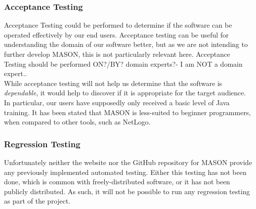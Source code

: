 \documentclass[11pt]{article}
\begin{document}



\subsubsection{Acceptance Testing}
Acceptance Testing could be performed to determine if the software can be operated effectively by our end users.
Acceptance testing can be useful for understanding the domain of our software better, but as we are not intending to further develop MASON, this is not particularly relevant here.
Acceptance Testing should be performed ON?/BY? domain experts?- I am NOT a domain expert..
\\

While acceptance testing will not help us determine that the software is \textit{dependable}, it would help to discover if it is appropriate for the target audience. In particular, our users have supposedly only received a basic level of Java training. It has been stated that MASON is less-suited to beginner programmers, when compared to other tools, such as NetLogo\cite{abm_platforms_review}.


\subsubsection{Regression Testing}
Unfortunately neither the website nor the GitHub repository for MASON provide any previously implemented automated testing.
Either this testing has not been done, which is common with freely-distributed software, or it has not been publicly distributed.
As such, it will not be possible to run any regression testing as part of the project.
\end{document}
